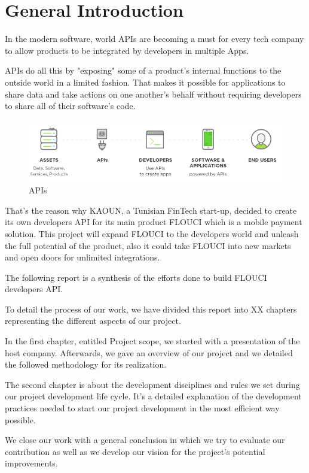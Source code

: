 \chapter*{General Introduction}
\graphicspath{{Introduction/figures/}}
\begin{spacing}{1.2}

In the modern software, world APIs are becoming a must for every tech company to allow products to be integrated by developers in multiple Apps.

APIs do all this by "exposing" some of a product's internal functions to the outside world in a limited fashion. That makes it possible for applications to share data and take actions on one another's behalf without requiring developers to share all of their software's code. 



\begin{figure}[!ht]\centering
\includegraphics[scale=0.6]{API.png}
\caption{APIs }
\label{fig:fig1}
\end{figure}

That's the reason why KAOUN, a Tunisian FinTech start-up, decided to create its own developers API for its main product FLOUCI which is a mobile payment solution. This project will expand FLOUCI to the developers world and unleash the full potential of the product, also it could take FLOUCI into new markets and open doors for unlimited integrations.\newline


The following report is a synthesis of the efforts done to build FLOUCI developers API.

 To detail the process of our work, we have divided this report into XX chapters representing the different aspects of our project.

In the first chapter, entitled Project scope, we started with a presentation of the host company. Afterwards, we gave an overview of our project and we detailed the followed methodology for its realization.


The second chapter is about the development disciplines and rules we set during our project development life cycle. It's a detailed explanation of the development practices needed to start our project development in the most efficient way possible. 



We close our work with a general conclusion in which we try to evaluate our contribution as well as we develop our vision for the project's potential improvements.




\end{spacing}
